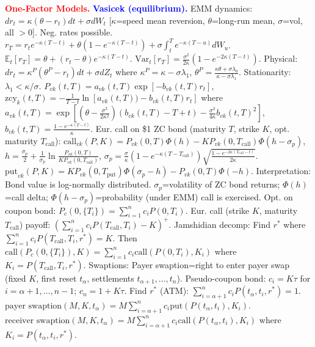 \documentclass[landscape]{article}
\begin{document}
\begin{multicols}{4}
\textcolor{red}{\textbf{One-Factor Models.}}
\textcolor{blue}{\textbf{Vasicek (equilibrium).}} EMM dynamics: $dr_t=\kappa(\theta-r_t)dt+\sigma dW_t$ [$\kappa$=speed mean reversion, $\theta$=long-run mean, $\sigma$=vol, all $>0$]. Neg. rates possible. $r_T=r_t e^{-\kappa(T-t)}+\theta(1-e^{-\kappa(T-t)})+\sigma\int_t^T e^{-\kappa(T-u)}dW_u$. $\mathbb{E}_t[r_T]=\theta+(r_t-\theta)e^{-\kappa(T-t)}$. $\text{Var}_t[r_T]=\frac{\sigma^2}{2\kappa}(1-e^{-2\kappa(T-t)})$. Physical: $dr_t=\kappa^P(\theta^P-r_t)dt+\sigma dZ_t$ where $\kappa^P=\kappa-\sigma\lambda_1$, $\theta^P=\frac{\kappa\theta+\sigma\lambda_0}{\kappa-\sigma\lambda_1}$. Stationarity: $\lambda_1<\kappa/\sigma$. $P_{vk}(t,T)=a_{vk}(t,T)\exp[-b_{vk}(t,T)r_t]$, $\text{zcy}_k(t,T)=-\frac{1}{T-t}\ln[a_{vk}(t,T))-b_{vk}(t,T)r_t]$ where $a_{vk}(t,T)=\exp[(\theta-\frac{\sigma^2}{2\kappa^2})(b_{vk}(t,T)-T+t)-\frac{\sigma^2}{4\kappa}b_{vk}(t,T)^2]$, $b_{vk}(t,T)=\frac{1-e^{-\kappa(T-t)}}{\kappa}$. Eur. call on \$1 ZC bond (maturity $T$, strike $K$, opt. maturity $T_{\text{call}}$): $\text{call}_{vk}(P,K)=P_{vk}(0,T)\Phi(h)-KP_{vk}(0,T_{\text{call}})\Phi(h-\sigma_p)$, $h=\frac{\sigma_p}{2}+\frac{1}{\sigma_p}\ln\frac{P_{vk}(0,T)}{KP_{vk}(0,T_{\text{call}})}$, $\sigma_p=\frac{\sigma}{\kappa}(1-e^{-\kappa(T-T_{\text{call}})})\sqrt{\frac{1-e^{-2\kappa(T_{\text{call}}-t)}}{2\kappa}}$. $\text{put}_{vk}(P,K)=KP_{vk}(0,T_{\text{put}})\Phi(\sigma_p-h)-P_{vk}(0,T)\Phi(-h)$. Interpretation: Bond value is log-normally distributed. $\sigma_p$=volatility of ZC bond returns; $\Phi(h)$=call delta; $\Phi(h-\sigma_p)$=probability (under EMM) call is exercised. Opt. on coupon bond: $P_c(0,\{T_i\})=\sum_{i=1}^n c_i P(0,T_i)$. Eur. call (strike $K$, maturity $T_{\text{call}}$) payoff: $(\sum_{i=1}^n c_i P(T_{\text{call}},T_i)-K)^+$. Jamshidian decomp: Find $r^*$ where $\sum_{i=1}^n c_i P(T_{\text{call}},T_i,r^*)=K$. Then $\text{call}(P_c(0,\{T_i\}),K)=\sum_{i=1}^n c_i\text{call}(P(0,T_i),K_i)$ where $K_i=P(T_{\text{call}},T_i,r^*)$. Swaptions: Payer swaption=right to enter payer swap (fixed $K$, first reset $t_\alpha$, settlements $t_{\alpha+1},\ldots,t_n$). Pseudo-coupon bond: $c_i=K\tau$ for $i=\alpha+1,\ldots,n-1$; $c_n=1+K\tau$. Find $r^*$ (ATM): $\sum_{i=\alpha+1}^n c_i P(t_\alpha,t_i,r^*)=1$. $\text{payer swaption}(M,K,t_\alpha)=M\sum_{i=\alpha+1}^n c_i\text{put}(P(t_\alpha,t_i),K_i)$. $\text{receiver swaption}(M,K,t_\alpha)=M\sum_{i=\alpha+1}^n c_i\text{call}(P(t_\alpha,t_i),K_i)$ where $K_i=P(t_\alpha,t_i,r^*)$.


\end{multicols}
\end{document}
